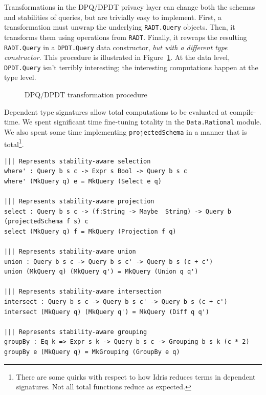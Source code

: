 \documentclass[12pt]{report}
\begin{document}
Transformations in the DPQ/DPDT privacy layer can change both the schemas and stabilities of queries, but are trivially easy to implement.
First, a transformation must unwrap the underlying \texttt{RADT.Query} objects.
Then, it transforms them using operations from \texttt{RADT}.
Finally, it rewraps the resulting \texttt{RADT.Query} in a \texttt{DPDT.Query} data constructor, \textit{but with a different type constructor}.
This procedure is illustrated in Figure~\ref{fig:query_wrapping}.
At the data level, \texttt{DPDT.Query} isn't terribly interesting; the interesting computations happen at the type level.

\begin{figure}
     \centering
     \def\svgwidth{1\linewidth}
     
     \caption{DPQ/DPDT transformation procedure}
     \label{fig:query_wrapping}
\end{figure}

Dependent type signatures allow total computations to be evaluated at compile-time.
We spent significant time fine-tuning totality in the \texttt{Data.Rational} module.
We also spent some time implementing \texttt{projectedSchema} in a manner that is total\footnote{There are some quirks with respect to how Idris reduces terms in dependent signatures. Not all total functions reduce as expected.}.

\begin{lstlisting}[float,caption={Representing privacy-aware transformations},label={lst:transformations}]
||| Represents stability-aware selection
where' : Query b s c -> Expr s Bool -> Query b s c
where' (MkQuery q) e = MkQuery (Select e q)

||| Represents stability-aware projection
select : Query b s c -> (f:String -> Maybe  String) -> Query b (projectedSchema f s) c
select (MkQuery q) f = MkQuery (Projection f q)

||| Represents stability-aware union
union : Query b s c -> Query b s c' -> Query b s (c + c')
union (MkQuery q) (MkQuery q') = MkQuery (Union q q')

||| Represents stability-aware intersection
intersect : Query b s c -> Query b s c' -> Query b s (c + c')
intersect (MkQuery q) (MkQuery q') = MkQuery (Diff q q')

||| Represents stability-aware grouping
groupBy : Eq k => Expr s k -> Query b s c -> Grouping b s k (c * 2)
groupBy e (MkQuery q) = MkGrouping (GroupBy e q)
\end{lstlisting}
\end{document}
